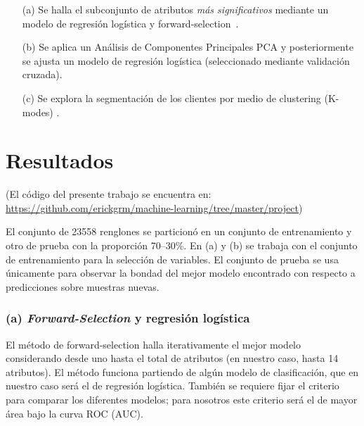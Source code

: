 \documentclass[letterpaper,11pt]{article}
\begin{document}
\begin{multicols}{2}
\begin{itemize}
    \item[(a)] Se halla el subconjunto de atributos \emph{más significativos} mediante un modelo de regresión logística
        y forward-selection~\cite[Cap. 6]{book1}.
    \item[(b)] Se aplica un Análisis de Componentes Principales PCA \cite{book2} y posteriormente se ajusta un modelo de regresión
        logística (seleccionado mediante validación cruzada). 
    \item[(c)] Se explora la segmentación de los clientes por medio de clustering (K-modes) \cite{kmodes}.
\end{itemize}

\section{Resultados}
{\small (El código del presente trabajo se encuentra en:
\url{https://github.com/erickgrm/machine-learning/tree/master/project})}

El conjunto de 23558 renglones se particionó en un conjunto de entrenamiento y otro de prueba con la
proporción 70--30\%. En (a) y (b) se trabaja con el conjunto de entrenamiento para la selección de variables. El
conjunto de prueba se usa únicamente para observar la bondad del mejor modelo encontrado con respecto a predicciones
sobre muestras nuevas. 
\subsubsection*{(a) \emph{Forward-Selection} y regresión logística}
El método de forward-selection\cite{book1} halla iterativamente el mejor modelo considerando desde uno hasta el total de atributos
(en nuestro caso, hasta 14 atributos). El método funciona partiendo de algún
modelo de clasificación, que en nuestro caso será el de regresión logística. También se requiere fijar el criterio
para comparar los diferentes modelos; para nosotros este criterio será el de mayor área bajo la curva ROC (AUC). 


\end{multicols}
\end{document}
